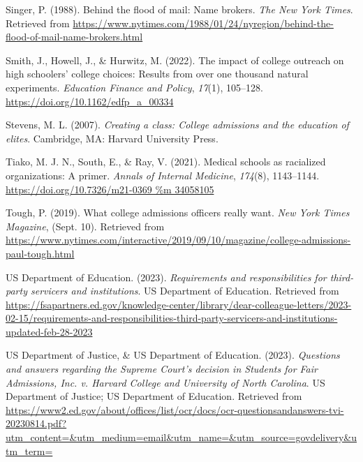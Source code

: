 \documentclass[
  12pt,
]{article}
\newlength{\cslhangindent}
\newlength{\cslentryspacingunit} %
\newenvironment{CSLReferences}[2] %
 {%
  \setlength{\parindent}{0pt}
  \ifodd #1
  \let\oldpar\par
  \def\par{\hangindent=\cslhangindent\oldpar}
  \fi
  \setlength{\parskip}{#2\cslentryspacingunit}
 }%
 {}
\begin{document}
\begin{CSLReferences}{1}{0}
\leavevmode{}%
Singer, P. (1988). Behind the flood of mail: Name brokers. \emph{The New York Times}. Retrieved from \url{https://www.nytimes.com/1988/01/24/nyregion/behind-the-flood-of-mail-name-brokers.html}

\leavevmode{}%
Smith, J., Howell, J., \& Hurwitz, M. (2022). The impact of college outreach on high schoolers' college choices: Results from over one thousand natural experiments. \emph{Education Finance and Policy}, \emph{17}(1), 105--128. \url{https://doi.org/10.1162/edfp_a_00334}

\leavevmode{}%
Stevens, M. L. (2007). \emph{Creating a class: {College} admissions and the education of elites}. Cambridge, MA: Harvard University Press.

\leavevmode{}%
Tiako, M. J. N., South, E., \& Ray, V. (2021). Medical schools as racialized organizations: A primer. \emph{Annals of Internal Medicine}, \emph{174}(8), 1143--1144. \href{https://doi.org/10.7326/m21-0369\%20\%m\%2034058105}{https://doi.org/10.7326/m21-0369 \%m 34058105}

\leavevmode{}%
Tough, P. (2019). What college admissions officers really want. \emph{New York Times Magazine}, (Sept. 10). Retrieved from \url{https://www.nytimes.com/interactive/2019/09/10/magazine/college-admissions-paul-tough.html}

\leavevmode{}%
US Department of Education. (2023). \emph{Requirements and responsibilities for third-party servicers and institutions}. {US Department of Education}. Retrieved from \url{https://fsapartners.ed.gov/knowledge-center/library/dear-colleague-letters/2023-02-15/requirements-and-responsibilities-third-party-servicers-and-institutions-updated-feb-28-2023}

\leavevmode{}%
US Department of Justice, \& US Department of Education. (2023). \emph{Questions and answers regarding the {Supreme Court's} decision in {Students for Fair Admissions, Inc. v. Harvard College and University of North Carolina}}. {US Department of Justice}; {US Department of Education}. Retrieved from \url{https://www2.ed.gov/about/offices/list/ocr/docs/ocr-questionsandanswers-tvi-20230814.pdf?utm_content=\&utm_medium=email\&utm_name=\&utm_source=govdelivery\&utm_term=}


\end{CSLReferences}
\end{document}

